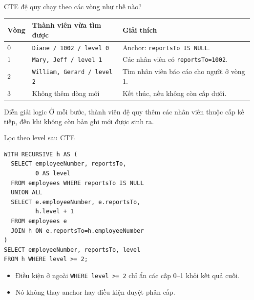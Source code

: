 \documentclass[aspectratio=169,10pt]{beamer}
\newcommand{\code}[1]{\texttt{#1}}
\begin{document}
\begin{frame}[fragile]{CTE đệ quy chạy theo các vòng như thế nào?}

\small
\begin{tabularx}{\linewidth}{>{\bfseries}l X X}
\toprule
Vòng & Thành viên vừa tìm được & Giải thích\\\midrule
$0$ & \texttt{Diane / 1002 / level 0} & Anchor: \texttt{reportsTo IS NULL}.\\
$1$ & \texttt{Mary, Jeff / level 1} & Các nhân viên có \texttt{reportsTo=1002}.\\
$2$ & \texttt{William, Gerard / level 2} & Tìm nhân viên báo cáo cho người ở vòng 1.\\
$3$ & Không thêm dòng mới & Kết thúc, nếu không còn cấp dưới.\\
\bottomrule
\end{tabularx}
\vspace{.4cm}
\begin{block}{Diễn giải logic}
Ở mỗi bước, thành viên đệ quy thêm các nhân viên thuộc cấp kế tiếp, đến khi không còn bản ghi mới được sinh ra.
\end{block}
\end{frame}

\begin{frame}[fragile]{Lọc theo level sau CTE}
\small
\begin{lstlisting}[basicstyle=\ttfamily\scriptsize]
WITH RECURSIVE h AS (
  SELECT employeeNumber, reportsTo,
         0 AS level
  FROM employees WHERE reportsTo IS NULL
  UNION ALL
  SELECT e.employeeNumber, e.reportsTo,
         h.level + 1
  FROM employees e
  JOIN h ON e.reportsTo=h.employeeNumber
)
SELECT employeeNumber, reportsTo, level
FROM h WHERE level >= 2;
\end{lstlisting}
\vspace{.1em}
\begin{itemize}
\item Điều kiện ở ngoài \code{WHERE level >= 2} chỉ ẩn các cấp 0--1 khỏi kết quả cuối.
\item Nó không thay anchor hay điều kiện duyệt phân cấp.
\end{itemize}
\end{frame}
\end{document}
